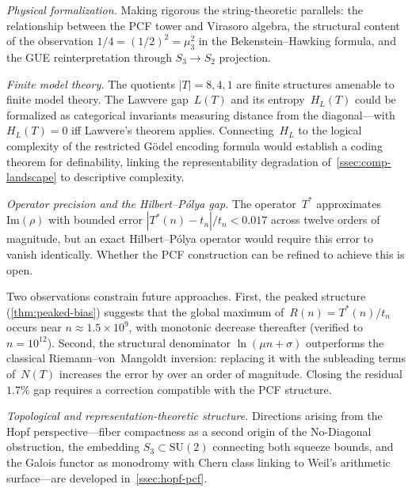 \emph{Physical formalization.}  Making rigorous the string-theoretic
parallels: the relationship between the PCF tower and Virasoro algebra,
the structural content of the observation $1/4=(1/2)^2=\mu_3^2$ in the
Bekenstein--Hawking formula, and the GUE reinterpretation through
$S_3\to S_2$ projection.

\emph{Finite model theory.}  The quotients $|T|=8, 4, 1$ are finite
structures amenable to finite model theory.  The Lawvere gap~$L(T)$ and
its entropy~$H_L(T)$ could be formalized as categorical invariants
measuring distance from the diagonal---with $H_L(T)=0$ iff Lawvere's
theorem applies.  Connecting~$H_L$ to the logical complexity of the
restricted G\"odel encoding formula would establish a coding theorem for
definability, linking the representability degradation
of~\cref{ssec:comp-landscape} to descriptive complexity.

\emph{Operator precision and the Hilbert--P\'olya gap.}
The operator~$T^*$ approximates $\mathrm{Im}(\rho)$ with
bounded error $|T^*(n)-t_n|/t_n < 0.017$ across twelve orders
of magnitude, but an exact Hilbert--P\'olya operator would
require this error to vanish identically.  Whether the PCF
construction can be refined to achieve this is open.

Two observations constrain future approaches.  First, the
peaked structure (\cref{thm:peaked-bias}) suggests
that the global maximum of~$R(n) = T^*(n)/t_n$ occurs near
$n \approx 1.5 \times 10^9$, with monotonic decrease
thereafter (verified to $n = 10^{12}$).  Second, the
structural denominator $\ln(\mu n + \sigma)$ outperforms
the classical Riemann--von~Mangoldt inversion: replacing it
with the subleading terms of~$N(T)$ increases the error by
over an order of magnitude.  Closing the residual $1.7\%$
gap requires a correction compatible with the PCF structure.

\emph{Topological and representation-theoretic structure.}
Directions arising from the Hopf perspective---fiber compactness as
a second origin of the No-Diagonal obstruction, the embedding
$S_3\subset\mathrm{SU}(2)$ connecting both squeeze bounds, and the
Galois functor as monodromy with Chern class linking to Weil's
arithmetic surface---are developed in~\cref{ssec:hopf-pcf}.
